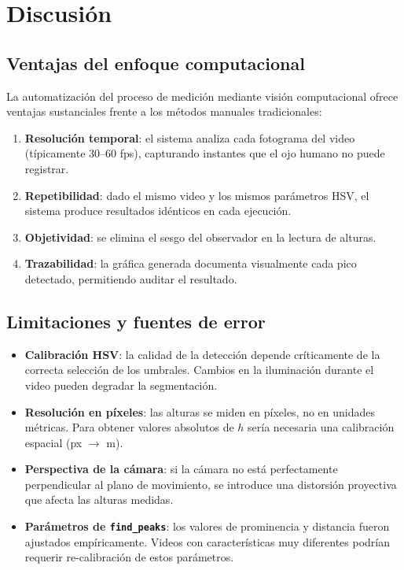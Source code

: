 \documentclass[12pt,a4paper]{article}
\begin{document}
\section{Discusión}

\subsection{Ventajas del enfoque computacional}

La automatización del proceso de medición mediante visión computacional ofrece ventajas sustanciales frente a los métodos manuales tradicionales:

\begin{enumerate}
    \item \textbf{Resolución temporal}: el sistema analiza cada fotograma del video (típicamente 30--60 fps), capturando instantes que el ojo humano no puede registrar.
    \item \textbf{Repetibilidad}: dado el mismo video y los mismos parámetros HSV, el sistema produce resultados idénticos en cada ejecución.
    \item \textbf{Objetividad}: se elimina el sesgo del observador en la lectura de alturas.
    \item \textbf{Trazabilidad}: la gráfica generada documenta visualmente cada pico detectado, permitiendo auditar el resultado.
\end{enumerate}

\subsection{Limitaciones y fuentes de error}

\begin{itemize}
    \item \textbf{Calibración HSV}: la calidad de la detección depende críticamente de la correcta selección de los umbrales. Cambios en la iluminación durante el video pueden degradar la segmentación.
    \item \textbf{Resolución en píxeles}: las alturas se miden en píxeles, no en unidades métricas. Para obtener valores absolutos de $h$ sería necesaria una calibración espacial (px $\rightarrow$ m).
    \item \textbf{Perspectiva de la cámara}: si la cámara no está perfectamente perpendicular al plano de movimiento, se introduce una distorsión proyectiva que afecta las alturas medidas.
    \item \textbf{Parámetros de \texttt{find\_peaks}}: los valores de prominencia y distancia fueron ajustados empíricamente. Videos con características muy diferentes podrían requerir re-calibración de estos parámetros.
\end{itemize}
\end{document}
